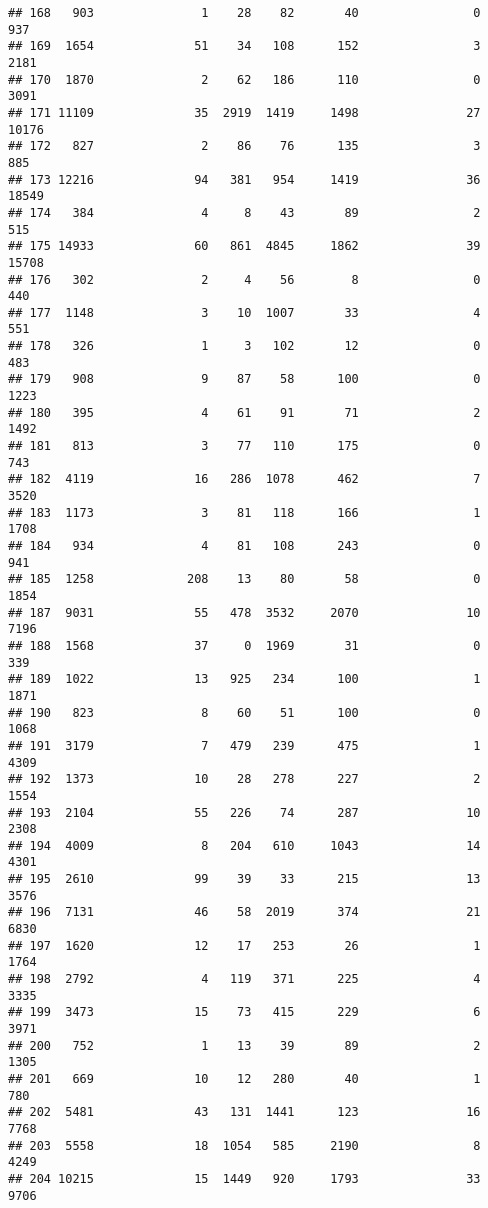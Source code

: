 \documentclass[
]{article}
\begin{document}
\begin{verbatim}
## 168   903               1    28    82       40                0   937
## 169  1654              51    34   108      152                3  2181
## 170  1870               2    62   186      110                0  3091
## 171 11109              35  2919  1419     1498               27 10176
## 172   827               2    86    76      135                3   885
## 173 12216              94   381   954     1419               36 18549
## 174   384               4     8    43       89                2   515
## 175 14933              60   861  4845     1862               39 15708
## 176   302               2     4    56        8                0   440
## 177  1148               3    10  1007       33                4   551
## 178   326               1     3   102       12                0   483
## 179   908               9    87    58      100                0  1223
## 180   395               4    61    91       71                2  1492
## 181   813               3    77   110      175                0   743
## 182  4119              16   286  1078      462                7  3520
## 183  1173               3    81   118      166                1  1708
## 184   934               4    81   108      243                0   941
## 185  1258             208    13    80       58                0  1854
## 187  9031              55   478  3532     2070               10  7196
## 188  1568              37     0  1969       31                0   339
## 189  1022              13   925   234      100                1  1871
## 190   823               8    60    51      100                0  1068
## 191  3179               7   479   239      475                1  4309
## 192  1373              10    28   278      227                2  1554
## 193  2104              55   226    74      287               10  2308
## 194  4009               8   204   610     1043               14  4301
## 195  2610              99    39    33      215               13  3576
## 196  7131              46    58  2019      374               21  6830
## 197  1620              12    17   253       26                1  1764
## 198  2792               4   119   371      225                4  3335
## 199  3473              15    73   415      229                6  3971
## 200   752               1    13    39       89                2  1305
## 201   669              10    12   280       40                1   780
## 202  5481              43   131  1441      123               16  7768
## 203  5558              18  1054   585     2190                8  4249
## 204 10215              15  1449   920     1793               33  9706

\end{verbatim}
\end{document}
